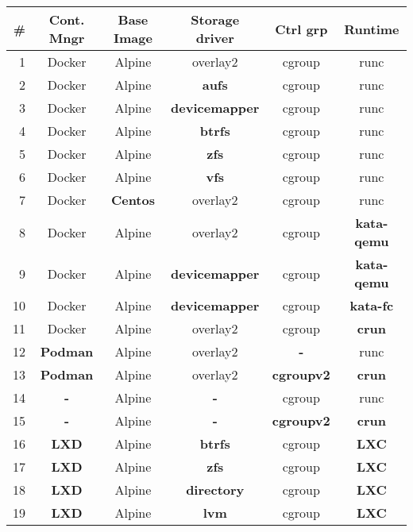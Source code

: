 \begin{table}[!h]
  \begin{center}
    \begin{tabular}{|r|c|c|c|c|c|}
      \hline
      \textbf{\#} & \textbf{Cont. Mngr} & \textbf{Base Image} & \textbf{Storage driver} & \textbf{Ctrl grp} & \textbf{Runtime} \\ \hline \hline
       1  & Docker & Alpine & overlay2 & cgroup & runc \\ \hline \hline
       2  & Docker & Alpine & \textbf{aufs} & cgroup & runc \\ \hline
       3  & Docker & Alpine & \textbf{devicemapper} & cgroup & runc \\ \hline
       4  & Docker & Alpine & \textbf{btrfs} & cgroup & runc \\ \hline
       5  & Docker & Alpine & \textbf{zfs} & cgroup & runc \\ \hline
       6  & Docker & Alpine & \textbf{vfs} & cgroup & runc \\ \hline
       7  & Docker & \textbf{Centos} & overlay2 & cgroup & runc \\ \hline
       8  & Docker & Alpine & overlay2 & cgroup & \textbf{kata-qemu} \\ \hline
       9  & Docker & Alpine & \textbf{devicemapper} & cgroup & \textbf{kata-qemu} \\ \hline
       10 & Docker & Alpine & \textbf{devicemapper} & cgroup & \textbf{kata-fc} \\ \hline
       11 & Docker & Alpine & overlay2 & cgroup & \textbf{crun} \\ \hline
       12 & \textbf{Podman} & Alpine & overlay2 & \textbf{-} & runc \\ \hline
       13 & \textbf{Podman} & Alpine & overlay2 & \textbf{cgroupv2} & \textbf{crun} \\ \hline
       14 & \textbf{-} & Alpine & \textbf{-} & cgroup & runc \\ \hline
       15 & \textbf{-} & Alpine & \textbf{-} & \textbf{cgroupv2} & \textbf{crun} \\ \hline
       16 & \textbf{LXD} & Alpine & \textbf{btrfs} & cgroup & \textbf{LXC} \\ \hline
       17 & \textbf{LXD} & Alpine & \textbf{zfs} & cgroup & \textbf{LXC} \\ \hline
       18 & \textbf{LXD} & Alpine & \textbf{directory} & cgroup & \textbf{LXC} \\ \hline
       19 & \textbf{LXD} & Alpine & \textbf{lvm} & cgroup & \textbf{LXC} \\ \hline
    \end{tabular}
  \end{center}
  \caption{}
  \label{tab:candidates}
\end{table}

